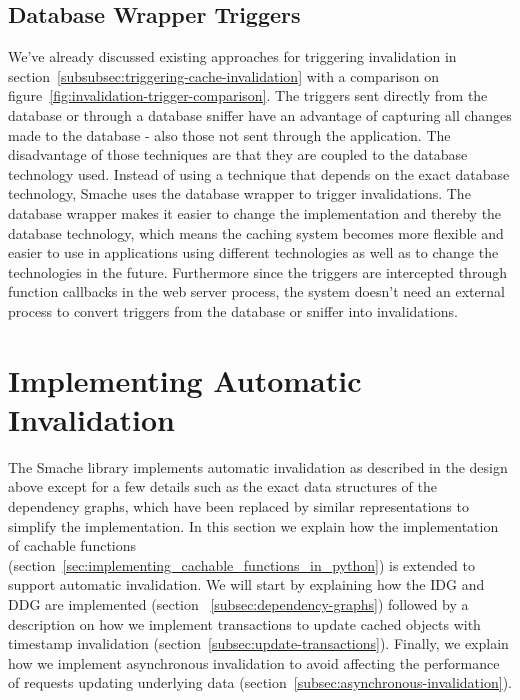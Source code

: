 
\subsection{Database Wrapper Triggers}
\label{subsec:database-wrapper-triggers}


We've already discussed existing approaches for triggering invalidation in section~\ref{subsubsec:triggering-cache-invalidation} with a comparison on figure~\ref{fig:invalidation-trigger-comparison}. The triggers sent directly from the database or through a database sniffer have an advantage of capturing all changes made to the database - also those not sent through the application. The disadvantage of those techniques are that they are coupled to the database technology used. Instead of using a technique that depends on the exact database technology, Smache uses the database wrapper to trigger invalidations. The database wrapper makes it easier to change the implementation and thereby the database technology, which means the caching system becomes more flexible and easier to use in applications using different technologies as well as to change the technologies in the future. Furthermore since the triggers are intercepted through function callbacks in the web server process, the system doesn't need an external process to convert triggers from the database or sniffer into invalidations.


\section{Implementing Automatic Invalidation}
\label{sec:implementing-automatic-invalidation}

The Smache library implements automatic invalidation as described in the design above except for a few details such as the exact data structures of the dependency graphs, which have been replaced by similar representations to simplify the implementation. In this section we explain how the implementation of cachable functions (section~\ref{sec:implementing_cachable_functions_in_python}) is extended to support automatic invalidation. We will start by explaining how the IDG and DDG are implemented (section ~\ref{subsec:dependency-graphs}) followed by a description on how we implement transactions to update cached objects with timestamp invalidation (section~\ref{subsec:update-transactions}). Finally, we explain how we implement asynchronous invalidation to avoid affecting the performance of requests updating underlying data (section~\ref{subsec:asynchronous-invalidation}).


